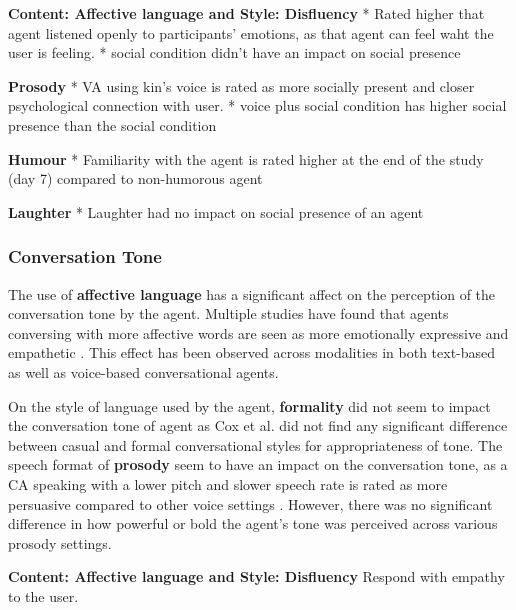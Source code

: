 \documentclass[sigconf,screen,review, anonymous]{acmart}
\newcommand{\cmt}[1]{}%
\begin{document}
\textbf{Content: Affective language and Style: Disfluency}
* Rated higher that agent listened openly to participants' emotions, as that agent can feel waht the user is feeling. \cite{hu2021enhancing}\cmt{[56]}
* social condition didn't have an impact on social presence \cite{lubold2016effects}\cmt{[86]}

\textbf{Prosody}
* VA using kin's voice is rated as more socially present and closer psychological connection with user. \cite{chan2021kinvoices}\cmt{[74]}
* voice plus social condition has higher social presence than the social condition \cite{lubold2016effects}\cmt{[86]}

\textbf{Humour}
* Familiarity with the agent is rated higher at the end of the study (day 7) compared to non-humorous agent \cite{go2021conversational}\cmt{[80]}

\textbf{Laughter}
* Laughter had no impact on social presence of an agent \cite{niewiadomski2013laugh}\cmt{[85]}

\subsubsection{Conversation Tone}

The use of \textbf{affective language} has a significant affect on the perception of the conversation tone by the agent. Multiple studies have found that agents conversing with more affective words are seen as more emotionally expressive and empathetic \cite{daher2020empathic}\cmt{[58]}\cite{diederich2019emulating}\cmt{[25]}\cite{yang2017perceived}\cmt{[44]}\cite{zhu2022effects}\cmt{[26]}. This effect has been observed across modalities in both text-based as well as voice-based conversational agents.

On the style of language used by the agent, \textbf{formality} did not seem to impact the conversation tone of agent as Cox et al. \cite{cox2022does}\cmt{[27]} did not find any significant difference between casual and formal conversational styles for appropriateness of tone. The speech format of \textbf{prosody} seem to have an impact on the conversation tone, as a CA speaking with a lower pitch and slower speech rate is rated as more persuasive compared to other voice settings \cite{dubiel2020persuasive}\cmt{[60]}. However, there was no significant difference in how powerful or bold the agent's tone was perceived across various prosody settings.

\textbf{Content: Affective language and Style: Disfluency}
Respond with empathy to the user. \cite{hu2021enhancing}\cmt{[56]}
\end{document}
